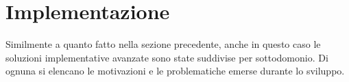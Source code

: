 
\section{Implementazione}\label{sec:implementazione}
Similmente a quanto fatto nella sezione precedente, anche in questo caso le soluzioni implementative avanzate sono state suddivise per sottodomonio. Di ognuna si elencano le motivazioni e le problematiche emerse durante lo sviluppo. 

